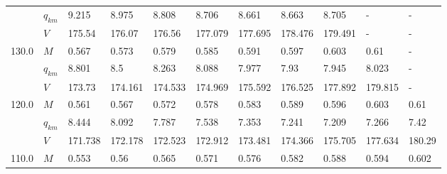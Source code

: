 \begin{tabular}{|l|l|lllllllll|}
      & $q_{km}$ &                     9.215 &                     8.975 &                     8.808 &                     8.706 &    8.661\cellcolor{green} &                     8.663 &                     8.705 &                         - &                         - \\
      & $V$ &                    175.54 &                    176.07 &                    176.56 &                   177.079 &  177.695\cellcolor{green} &                   178.476 &                   179.491 &                         - &                         - \\
\hline
130.0 & $M$ &                     0.567 &                     0.573 &                     0.579 &                     0.585 &                     0.591 &    0.597\cellcolor{green} &                     0.603 &                      0.61 &                         - \\
      & $q_{km}$ &                     8.801 &                       8.5 &                     8.263 &                     8.088 &                     7.977 &     7.93\cellcolor{green} &                     7.945 &                     8.023 &                         - \\
      & $V$ &                    173.73 &                   174.161 &                   174.533 &                   174.969 &                   175.592 &  176.525\cellcolor{green} &                   177.892 &                   179.815 &                         - \\
\hline
120.0 & $M$ &                     0.561 &                     0.567 &                     0.572 &                     0.578 &                     0.583 &                     0.589 &    0.596\cellcolor{green} &                     0.603 &                      0.61 \\
      & $q_{km}$ &                     8.444 &                     8.092 &                     7.787 &                     7.538 &                     7.353 &                     7.241 &    7.209\cellcolor{green} &                     7.266 &                      7.42 \\
      & $V$ &                   171.738 &                   172.178 &                   172.523 &                   172.912 &                   173.481 &                   174.366 &  175.705\cellcolor{green} &                   177.634 &                    180.29 \\
\hline
110.0 & $M$ &                     0.553 &                      0.56 &                     0.565 &                     0.571 &                     0.576 &                     0.582 &                     0.588 &    0.594\cellcolor{green} &                     0.602 \\

\end{tabular}
